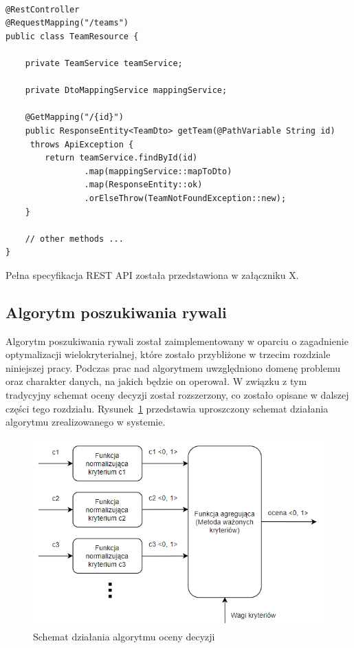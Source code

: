\begin{minipage}{\linewidth}
\begin{lstlisting}[label=list:resource, caption=Przykładowa rejestracja kontrolera, basicstyle=\footnotesize\ttfamily]

@RestController
@RequestMapping("/teams")
public class TeamResource {

    private TeamService teamService;

    private DtoMappingService mappingService;

    @GetMapping("/{id}")
    public ResponseEntity<TeamDto> getTeam(@PathVariable String id)
     throws ApiException {
        return teamService.findById(id)
                .map(mappingService::mapToDto)
                .map(ResponseEntity::ok)
                .orElseThrow(TeamNotFoundException::new);
    }
    
    // other methods ...
}

\end{lstlisting}
\end{minipage}

Pełna specyfikacja REST API została przedstawiona w załączniku X.

\subsection{Algorytm poszukiwania rywali}

Algorytm poszukiwania rywali został zaimplementowany w oparciu o zagadnienie optymalizacji wielokryterialnej, które zostało przybliżone w trzecim rozdziale niniejszej pracy. Podczas prac nad algorytmem uwzględniono domenę problemu oraz charakter danych, na jakich będzie on operował. W związku z tym tradycyjny schemat oceny decyzji został rozszerzony, co zostało opisane w dalszej części tego rozdziału. Rysunek~\ref{fig:diagram-alg-ext} przedstawia uproszczony schemat działania algorytmu zrealizowanego w systemie.

\begin{figure}[H]
\centering
\includegraphics[width=0.8\linewidth]{03-koncept/rys/algorytm.PNG}
\caption{Schemat działania algorytmu oceny decyzji}
\label{fig:diagram-alg-ext}
\end{figure}

